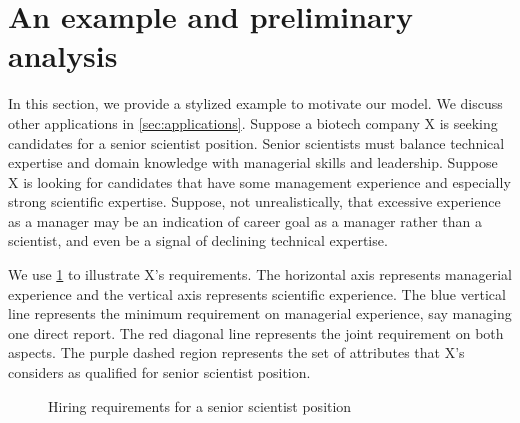 \section{An example and preliminary analysis}\label{subsec:example}
In this section, we provide a stylized example to motivate our model. We discuss other applications in \cref{sec:applications}. Suppose a biotech company X is seeking candidates for a senior scientist
position. Senior scientists must balance technical expertise and domain
knowledge with managerial skills and leadership. Suppose X is looking for
candidates that have some management experience and especially strong
scientific expertise. Suppose, not unrealistically, that excessive
experience as a manager may be an indication of career goal as a manager
rather than a scientist, and even be a signal of declining technical
expertise.

We use \cref{fig: hiring} to illustrate X's requirements. The horizontal axis 
represents managerial experience and the vertical axis  represents
scientific experience. The blue vertical line represents the minimum
requirement on managerial experience, say managing one direct report. The
red diagonal line represents the joint requirement on both aspects. The purple dashed region represents the set of
attributes that X's considers as qualified for senior scientist position.


\begin{figure}[h] 
\centering 
{}
\caption{Hiring requirements for a senior scientist position}
\label{fig: hiring}
  \end{figure}
  
